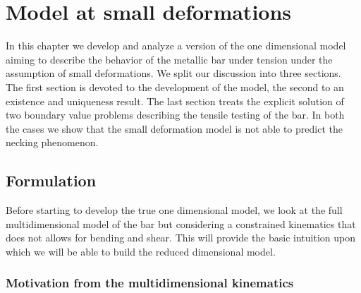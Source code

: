 \documentclass[a4paper,10pt,twoside]{amsbook}
\numberwithin{section}{chapter}
\numberwithin{equation}{chapter}
\theoremstyle{definition}
\begin{document}
\chapter{Model at small deformations}
\label{chap:small-neck}

In this chapter we develop and analyze a version of the one dimensional model aiming to describe the behavior of the metallic bar under tension under the assumption of small deformations. We split our discussion into three sections. The first section is devoted to the development of the model, the second to an existence and uniqueness result. The last section treats the explicit solution of two boundary value problems describing the tensile testing of the bar. In both the cases we show that the small deformation model is not able to predict the necking phenomenon. 

\section{Formulation}
\label{sec:small-model-1d}

Before starting to develop the true one dimensional model, we look at the full multidimensional model of the bar but considering a constrained kinematics that does not allows for bending and shear. This will provide the basic intuition upon which we will be able to build the reduced dimensional model.

\subsection{Motivation from the multidimensional kinematics}
\end{document}
